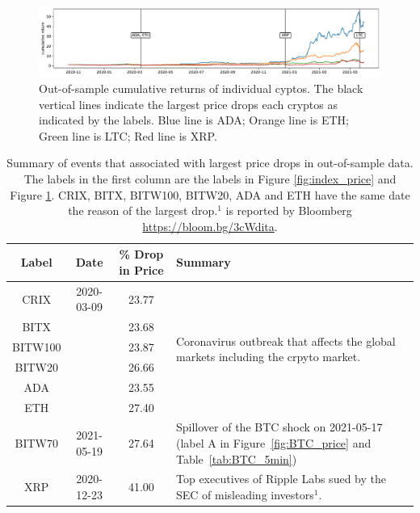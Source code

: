 \begin{figure}[t]
\includegraphics[width=\textwidth]{_pics/individualCoins_price.pdf}
  \caption{Out-of-sample cumulative returns of individual cyptos.
  The black vertical lines indicate the largest price drops each
  cryptos as indicated by the labels.
    \textcolor{plt1}{Blue line} is ADA;
  \textcolor{plt2}{Orange line} is ETH;
  \textcolor{plt3}{Green line} is LTC;
  \textcolor{plt4}{Red line} is XRP.}

\label{fig:individualCoins_price}
\end{figure}

\begin{table}[t]
    \centering
      \begin{tabularx}{.8\textwidth}{cccX}
        \toprule
        Label &  Date & \% Drop in Price &  Summary\\
        \midrule
        CRIX    &2020-03-09 & 23.77 &
        \multirow[t]{6}{\hsize}{Coronavirus outbreak that affects the
          global markets including the crpyto market.}\\ 
        BITX    & & 23.68 &  \\
        BITW100 & & 23.87 &  \\
        BITW20  & & 26.66 &  \\
        ADA     & & 23.55 &  \\
        ETH     & & 27.40 &  \\
        BITW70  & 2021-05-19 & 27.64 & Spillover of the BTC shock on
        2021-05-17 (label A in Figure~\ref{fig:BTC_price} and
        Table~\ref{tab:BTC_5min})\\ 
        XRP     & 2020-12-23 & 41.00 & Top executives of Ripple Labs
        sued by the SEC of misleading investors$^1$. \\ 
        \bottomrule
      \end{tabularx}
        \caption{Summary of events that associated with largest price drops in out-of-sample data.
        The labels in the first column are the labels in Figure \ref{fig:index_price} and Figure \ref{fig:individualCoins_price}.
        CRIX, BITX, BITW100, BITW20, ADA and ETH have the same date
        the reason of the largest drop.$^1$ is reported by Bloomberg
        \url{https://bloom.bg/3cWdita}.} 
        \label{tab:All_min}
  \end{table}
\clearpage
\newpage
